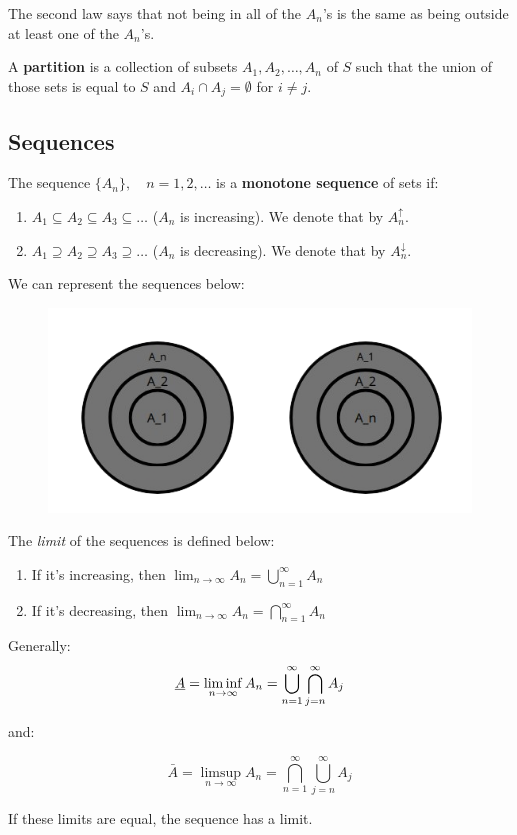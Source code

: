 \documentclass[12pt]{book}
\theoremstyle{definition}
\begin{document}
The second law says that not being in all of the \(A_n\)'s is the same as being outside at least one of the \(A_n\)'s.

A \textbf{partition} is a collection of subsets \(A_1, A_2, \dots, A_n\) of \(S\) such that the union of those sets is equal to \(S\) and \(A_i \cap A_j = \emptyset\) for \(i \neq j\).

\subsection{Sequences}
The sequence $\{A_n\}, \quad n = 1, 2, \dots$ is a \textbf{monotone sequence} of sets if:
\begin{enumerate}
    \item $A_1 \subseteq A_2 \subseteq A_3 \subseteq \dots$ ($A_n$ is increasing). We denote that by $A_n^{\uparrow}$.
    \item $A_1 \supseteq A_2 \supseteq A_3 \supseteq \dots$ ($A_n$ is decreasing). We denote that by $A_n^{\downarrow}$.
\end{enumerate}

We can represent the sequences below:
\begin{figure}[h!]
    \includegraphics[width=\linewidth]{../assets/A_n.png}
\end{figure}

The \textit{limit} of the sequences is defined below:
\begin{enumerate}
    \item If it's increasing, then $\lim_{n \to \infty} A_n = \bigcup_{n = 1}^{\infty} A_n$
    \item If it's decreasing, then $\lim_{n \to \infty} A_n = \bigcap_{n = 1}^{\infty} A_n$
\end{enumerate}

Generally:
\begin{equation}
    \uline{A} = \liminf_{n \to \infty} A_n = \bigcup_{n = 1}^{\infty}\bigcap_{j = n}^{\infty} A_j
\end{equation}

and: 

\begin{equation}
    \bar{A} = \limsup_{n \to \infty} A_n = \bigcap_{n = 1}^{\infty}\bigcup_{j = n}^{\infty} A_j
\end{equation}

If these limits are equal, the sequence has a limit.
\end{document}
